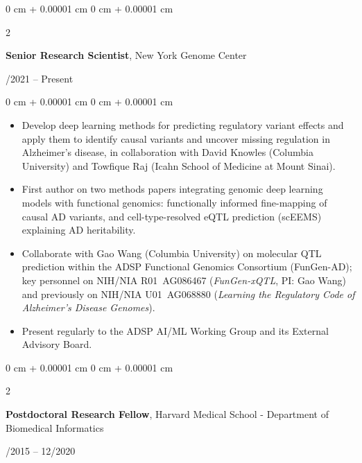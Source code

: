 \documentclass[10pt, letterpaper]{article}
\newenvironment{highlights}{
    \begin{itemize}[
        topsep=0.10 cm,
        parsep=0.10 cm,
        partopsep=0pt,
        itemsep=0pt,
        leftmargin=0 cm + 10pt
    ]
}{
    \end{itemize}
} %
\newenvironment{onecolentry}{
    \begin{adjustwidth}{
        0 cm + 0.00001 cm
    }{
        0 cm + 0.00001 cm
    }
}{
    \end{adjustwidth}
} %
\newenvironment{twocolentry}[2][]{
    \onecolentry
    \def\secondColumn{#2}
    \setcolumnwidth{\fill, 4.5 cm}
    \begin{paracol}{2}
}{
    \switchcolumn \raggedleft \secondColumn
    \end{paracol}
    \endonecolentry
} %
\begin{document}
        \begin{twocolentry}{
            01/2021 – Present
        }
            \textbf{Senior Research Scientist}, New York Genome Center
            \end{twocolentry}

        \vspace{0.10 cm}
        \begin{onecolentry}
            \begin{highlights}
                \item Develop deep learning methods for predicting regulatory variant effects and apply them to identify causal variants and uncover missing regulation in Alzheimer's disease, in collaboration with David Knowles (Columbia University) and Towfique Raj (Icahn School of Medicine at Mount Sinai).
                \item First author on two methods papers integrating genomic deep learning models with functional genomics: functionally informed fine-mapping of causal AD variants, and cell-type-resolved eQTL prediction (scEEMS) explaining AD heritability.
                \item Collaborate with Gao Wang (Columbia University) on molecular QTL prediction within the ADSP Functional Genomics Consortium (FunGen-AD); key personnel on NIH/NIA R01~AG086467 (\textit{FunGen-xQTL}, PI: Gao Wang) and previously on NIH/NIA U01~AG068880 (\textit{Learning the Regulatory Code of Alzheimer's Disease Genomes}).
                \item Present regularly to the ADSP AI/ML Working Group and its External Advisory Board.
            \end{highlights}
        \end{onecolentry}

        \vspace{0.20 cm}


        \begin{twocolentry}{
            03/2015 – 12/2020
        }
            \textbf{Postdoctoral Research Fellow}, Harvard Medical School - Department of Biomedical Informatics
            \end{twocolentry}
\end{document}
